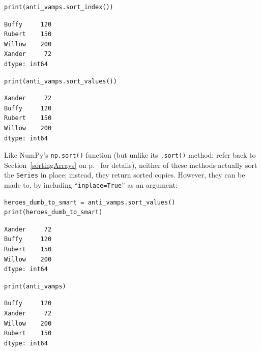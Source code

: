 \begin{Verbatim}[fontsize=\small,samepage=true,frame=single,framesep=3mm]
print(anti_vamps.sort_index())
\end{Verbatim}
\vspace{-.3in}

\begin{Verbatim}[fontsize=\small,samepage=true,frame=leftline,framesep=5mm,framerule=1mm]
Buffy     120
Rubert    150
Willow    200
Xander     72
dtype: int64
\end{Verbatim}

\begin{Verbatim}[fontsize=\small,samepage=true,frame=single,framesep=3mm]
print(anti_vamps.sort_values())
\end{Verbatim}
\vspace{-.3in}

\begin{Verbatim}[fontsize=\small,samepage=true,frame=leftline,framesep=5mm,framerule=1mm]
Xander     72
Buffy     120
Rubert    150
Willow    200
dtype: int64
\end{Verbatim}

Like NumPy's \texttt{np.sort()} function (but unlike its \texttt{.sort()}
method; refer back to Section~\ref{sortingArrays} on p.~\pageref{sortingArrays}
for details), neither of these methods actually sort the \texttt{Series} in
place; instead, they return sorted copies. However, they can be made to, by
including ``\texttt{inplace=True}'' as an argument:

\begin{Verbatim}[fontsize=\small,samepage=true,frame=single,framesep=3mm]
heroes_dumb_to_smart = anti_vamps.sort_values()
print(heroes_dumb_to_smart)
\end{Verbatim}
\vspace{-.3in}

\begin{Verbatim}[fontsize=\small,samepage=true,frame=leftline,framesep=5mm,framerule=1mm]
Xander     72
Buffy     120
Rubert    150
Willow    200
dtype: int64
\end{Verbatim}

\begin{Verbatim}[fontsize=\small,samepage=true,frame=single,framesep=3mm]
print(anti_vamps)
\end{Verbatim}
\vspace{-.3in}

\begin{Verbatim}[fontsize=\small,samepage=true,frame=leftline,framesep=5mm,framerule=1mm]
Buffy     120
Xander     72
Willow    200
Rubert    150
dtype: int64
\end{Verbatim}

